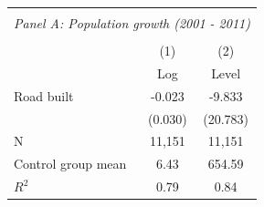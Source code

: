 \begin{tabular}{l*{2}{c}} \hline
\hline \\ \multicolumn{3}{c}{\textit{Panel A: Population growth (2001 - 2011)}} \\\\ [-1ex] \hline                           &\multicolumn{1}{c}{(1)} & \multicolumn{1}{c}{(2)} \\                          &\multicolumn{1}{c}{Log} &\multicolumn{1}{c}{Level} \\ \hline
Road built               &      -0.023   &      -9.833   \\
                         &     (0.030)   &    (20.783)   \\
\hline
N                        &      11,151   &      11,151   \\
Control group mean       &        6.43   &      654.59   \\
$ R^{2} $                &        0.79   &        0.84   \\
\end{tabular}
